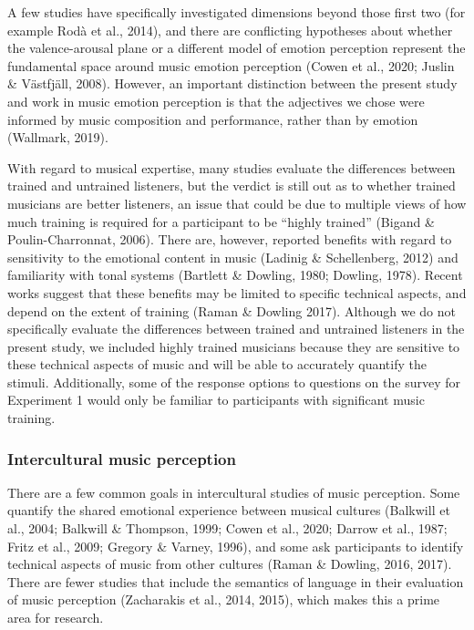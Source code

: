 \documentclass[
  english,
  man]{apa6}
\begin{document}
A few studies have specifically investigated dimensions beyond those first two (for example Rodà et al., 2014), and there are conflicting hypotheses about whether the valence-arousal plane or a different model of emotion perception represent the fundamental space around music emotion perception (Cowen et al., 2020; Juslin \& Västfjäll, 2008). However, an important distinction between the present study and work in music emotion perception is that the adjectives we chose were informed by music composition and performance, rather than by emotion (Wallmark, 2019).

With regard to musical expertise, many studies evaluate the differences between trained and untrained listeners, but the verdict is still out as to whether trained musicians are better listeners, an issue that could be due to multiple views of how much training is required for a participant to be ``highly trained'' (Bigand \& Poulin-Charronnat, 2006). There are, however, reported benefits with regard to sensitivity to the emotional content in music (Ladinig \& Schellenberg, 2012) and familiarity with tonal systems (Bartlett \& Dowling, 1980; Dowling, 1978). Recent works suggest that these benefits may be limited to specific technical aspects, and depend on the extent of training (Raman \& Dowling 2017). Although we do not specifically evaluate the differences between trained and untrained listeners in the present study, we included highly trained musicians because they are sensitive to these technical aspects of music and will be able to accurately quantify the stimuli. Additionally, some of the response options to questions on the survey for Experiment 1 would only be familiar to participants with significant music training.

\hypertarget{intercultural-music-perception}{%
\subsubsection{Intercultural music perception}\label{intercultural-music-perception}}

There are a few common goals in intercultural studies of music perception. Some quantify the shared emotional experience between musical cultures (Balkwill et al., 2004; Balkwill \& Thompson, 1999; Cowen et al., 2020; Darrow et al., 1987; Fritz et al., 2009; Gregory \& Varney, 1996), and some ask participants to identify technical aspects of music from other cultures (Raman \& Dowling, 2016, 2017). There are fewer studies that include the semantics of language in their evaluation of music perception (Zacharakis et al., 2014, 2015), which makes this a prime area for research.
\end{document}
